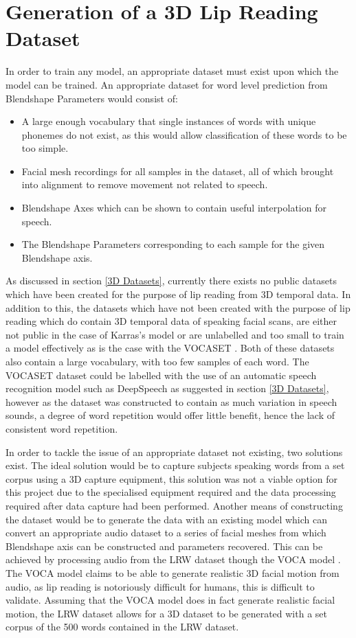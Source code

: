 \section{Generation of a 3D Lip Reading Dataset} \label{sec:dataset_gen}
In order to train any model, an appropriate dataset must exist upon which the model can be trained.
An appropriate dataset for word level prediction from Blendshape Parameters would consist of:
\begin{itemize}
   \item A large enough vocabulary that single instances of words with unique phonemes do not exist, as this would allow classification of these words to be too simple.
   \item Facial mesh recordings for all samples in the dataset, all of which brought into alignment to remove movement not related to speech.
   \item Blendshape Axes which can be shown to contain useful interpolation for speech.
   \item The Blendshape Parameters corresponding to each sample for the given Blendshape axis.
\end{itemize}

As discussed in section \ref{3D Datasets}, currently there exists no public datasets which have been created for the purpose of lip reading from 3D temporal data.
In addition to this, the datasets which have not been created with the purpose of lip reading which do contain 3D temporal data of speaking facial scans, are either not public in the case of Karras's model \cite{Karras2017a} or are unlabelled and too small to train a model effectively as is the case with the VOCASET \cite{Cudeiro2019}.
Both of these datasets also contain a large vocabulary, with too few samples of each word.
The VOCASET dataset could be labelled with the use of an automatic speech recognition model such as DeepSpeech as suggested in section \ref{3D Datasets}, however as the dataset was constructed to contain as much variation in speech sounds, a degree of word repetition would offer little benefit, hence the lack of consistent word repetition.

In order to tackle the issue of an appropriate dataset not existing, two solutions exist.
The ideal solution would be to capture subjects speaking words from a set corpus using a 3D capture equipment, this solution was not a viable option for this project due to the specialised equipment required and the data processing required after data capture had been performed.
Another means of constructing the dataset would be to generate the data with an existing model which can convert an appropriate audio dataset to a series of facial meshes from which Blendshape axis can be constructed and parameters recovered.
This can be achieved by processing audio from the LRW dataset \cite{Chung2016} though the VOCA model \cite{Cudeiro2019}.
The VOCA model claims to be able to generate realistic 3D facial motion from audio, as lip reading is notoriously difficult for humans, this is difficult to validate.
Assuming that the VOCA model does in fact generate realistic facial motion, the LRW dataset allows for a 3D dataset to be generated with a set corpus of the 500 words contained in the LRW dataset.

